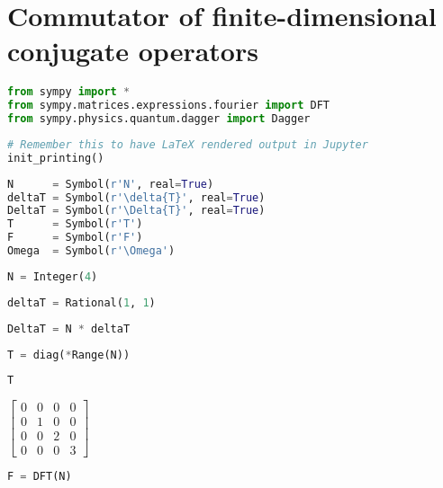 \section{Commutator of finite-dimensional conjugate operators}\label{sec:jpynb:finite-comm}

\begin{lstlisting}[language=Python]
from sympy import *
from sympy.matrices.expressions.fourier import DFT
from sympy.physics.quantum.dagger import Dagger
\end{lstlisting}

\begin{lstlisting}[language=Python]
# Remember this to have LaTeX rendered output in Jupyter
init_printing()
\end{lstlisting}

\begin{lstlisting}[language=Python]
N      = Symbol(r'N', real=True)
deltaT = Symbol(r'\delta{T}', real=True)
DeltaT = Symbol(r'\Delta{T}', real=True)
T      = Symbol(r'T')
F      = Symbol(r'F')
Omega  = Symbol(r'\Omega')
\end{lstlisting}

\begin{lstlisting}[language=Python]
N = Integer(4)
\end{lstlisting}

\begin{lstlisting}[language=Python]
deltaT = Rational(1, 1)
\end{lstlisting}

\begin{lstlisting}[language=Python]
DeltaT = N * deltaT
\end{lstlisting}

\begin{lstlisting}[language=Python]
T = diag(*Range(N))
\end{lstlisting}

\begin{lstlisting}[language=Python]
T
\end{lstlisting}

\(\displaystyle \left[\begin{matrix}0 & 0 & 0 & 0\\0 & 1 & 0 & 0\\0 & 0 & 2 & 0\\0 & 0 & 0 & 3\end{matrix}\right]\)

\begin{lstlisting}[language=Python]
F = DFT(N)
\end{lstlisting}

